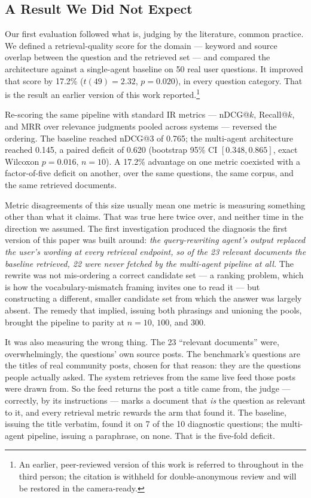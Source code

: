 \documentclass[10pt,conference]{IEEEtran}
\begin{document}
\subsection{A Result We Did Not Expect}

Our first evaluation followed what is, judging by the literature, common
practice. We defined a retrieval-quality score for the domain --- keyword and
source overlap between the question and the retrieved set --- and compared the
architecture against a single-agent baseline on 50 real user questions. It
improved that score by 17.2\% ($t(49)=2.32$, $p=0.020$), in every question
category. That is the result an earlier version of this work
reported.\footnote{An earlier, peer-reviewed version of this work is referred to
throughout in the third person; the citation is withheld for double-anonymous
review and will be restored in the camera-ready.}

Re-scoring the same pipeline with standard IR metrics --- nDCG@$k$, Recall@$k$,
and MRR over relevance judgments pooled across systems --- reversed the ordering.
The baseline reached nDCG@3 of 0.765; the multi-agent architecture reached 0.145,
a paired deficit of 0.620 (bootstrap 95\% CI $[0.348,0.865]$, exact Wilcoxon
$p=0.016$, $n=10$). A 17.2\% advantage on one metric coexisted with a
factor-of-five deficit on another, over the same questions, the same corpus, and
the same retrieved documents.

Metric disagreements of this size usually mean one metric is measuring something
other than what it claims. That was true here twice over, and neither time in the
direction we assumed. The first investigation produced the diagnosis the first
version of this paper was built around: \emph{the query-rewriting agent's output
replaced the user's wording at every retrieval endpoint, so of the 23 relevant
documents the baseline retrieved, 22 were never fetched by the multi-agent
pipeline at all.} The rewrite was not mis-ordering a correct candidate set --- a
ranking problem, which is how the vocabulary-mismatch framing invites one to read
it --- but constructing a different, smaller candidate set from which the answer
was largely absent. The remedy that implied, issuing both phrasings and unioning
the pools, brought the pipeline to parity at $n=10$, $100$, and $300$.

It was also measuring the wrong thing. The 23 ``relevant documents'' were,
overwhelmingly, the questions' own source posts. The benchmark's questions are the
titles of real community posts, chosen for that reason: they are the questions
people actually asked. The system retrieves from the same live feed those posts
were drawn from. So the feed returns the post a title came from, the judge ---
correctly, by its instructions --- marks a document that \emph{is} the question as
relevant to it, and every retrieval metric rewards the arm that found it. The
baseline, issuing the title verbatim, found it on 7 of the 10 diagnostic
questions; the multi-agent pipeline, issuing a paraphrase, on none. That is the
five-fold deficit.
\end{document}

